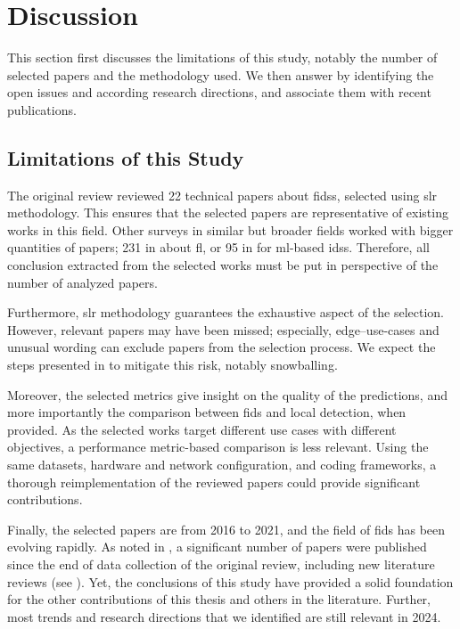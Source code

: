 \section{Discussion\label{sec:sota.discuss}}

This section first discusses the limitations of this study, notably the number of selected papers and the methodology used.
We then answer  by identifying the open issues and according research directions, and associate them with recent publications.


\subsection{Limitations of this Study\label{sec:sota.discuss.limits}}

The original review reviewed 22 technical papers about \glspl{fids}, selected using \gls{slr} methodology.
This ensures that the selected papers are representative of existing works in this field.
Other surveys in similar but broader fields worked with bigger quantities of papers; 231 in \cite{lo_SystematicLiteratureReview_2021} about \gls{fl}, or 95 in \cite{dacosta_InternetThingssurvey_2019} for \gls{ml}-based \glspl{ids}.
Therefore, all conclusion extracted from the selected works must be put in perspective of the number of analyzed papers.

Furthermore, \gls{slr} methodology guarantees the exhaustive aspect of the selection.
However, relevant papers may have been missed; especially, edge--use-cases and unusual wording can exclude papers from the selection process.
We expect the steps presented in  to mitigate this risk, notably snowballing.

Moreover, the selected metrics give insight on the quality of the predictions, and more importantly the comparison between \gls{fids} and local detection, when provided.
As the selected works target different use cases with different objectives, a performance metric-based comparison is less relevant.
Using the same datasets, hardware and network configuration, and coding frameworks, a thorough reimplementation of the reviewed papers could provide significant contributions.

Finally, the selected papers are from 2016 to 2021, and the field of \gls{fids} has been evolving rapidly.
As noted in , a significant number of papers were published since the end of data collection of the original review, including new literature reviews (see ).
Yet, the conclusions of this study have provided a solid foundation for the other contributions of this thesis and others in the literature.
Further, most trends and research directions that we identified are still relevant in 2024.


